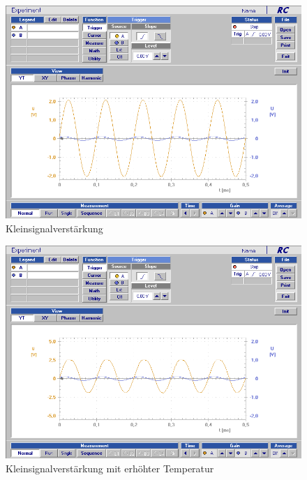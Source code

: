 \documentclass[12pt,a4paper]{article}
\begin{document}
\begin{figure}[H]
	\centering
	\includegraphics[scale=0.5]{./data/Braun_Kurz_PS8/Kleinsignalverstaerkung.png}
	\caption{Kleinsignalverstärkung}
	\label{fig:kleinsignalverstaerkung}
\end{figure}

\begin{figure}[H]
	\centering
	\includegraphics[scale=0.5]{./data/Braun_Kurz_PS8/Kleinsignalverstaerkung_Temp.png}
	\caption{Kleinsignalverstärkung mit erhöhter Temperatur}
	\label{fig:kleinsignalverstaerkung_temp}
\end{figure}
\end{document}
